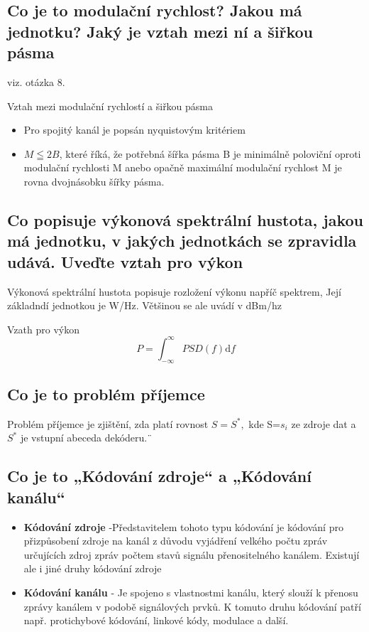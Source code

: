 \subsection{Co je to modulační rychlost? Jakou má jednotku? Jaký je vztah mezi ní a šiřkou pásma}
viz. otázka 8.

Vztah mezi modulační rychlostí a šiřkou pásma
\begin{itemize}
    \item Pro spojitý kanál je popsán nyquistovým kritériem
    \item $M \leqq 2B $, které říká, že potřebná šířka pásma B je minimálně poloviční oproti modulační rychlosti M anebo opačně maximální modulační rychlost M je rovna dvojnásobku šířky pásma.
\end{itemize}

\subsection{Co popisuje výkonová spektrální hustota, jakou má jednotku, v jakých jednotkách se zpravidla udává. Uveďte vztah pro výkon}
 Výkonová spektrální hustota popisuje rozložení výkonu napříč spektrem, Její základndí jednotkou je W/Hz. Většinou se ale uvádí v dBm/hz

Vzath pro výkon
$$P = \int_{-\infty}^{\infty} PSD(f)\mathrm{d}f$$

\subsection{Co je to problém příjemce}
Problém příjemce je zjištění, zda platí rovnost $S=S^*, $ kde S=${s_i}$ ze zdroje dat a $S^*$ je vstupní abeceda dekóderu.¨

\subsection{Co je to „Kódování zdroje“ a „Kódování kanálu“ }
\begin{itemize}
    \item \textbf{Kódování zdroje} -Představitelem tohoto typu kódování je kódování pro přizpůsobení zdroje na kanál z důvodu vyjádření velkého počtu zpráv určujících zdroj zpráv počtem stavů signálu přenositelného kanálem. Existují ale i jiné druhy kódování zdroje
    \item \textbf{ Kódování kanálu} - Je spojeno s vlastnostmi kanálu, který slouží k přenosu zprávy kanálem v podobě signálových prvků. K tomuto druhu kódování patří např. protichybové kódování, linkové kódy, modulace a další.
\end{itemize}

